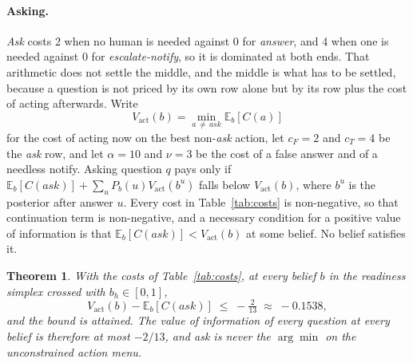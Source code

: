 \documentclass{article}
\newtheorem{theorem}{Theorem} %
\begin{document}
\paragraph{Asking.} \emph{Ask} costs 2 when no human is needed against 0 for
\emph{answer}, and 4 when one is needed against 0 for \emph{escalate-notify}, so
it is dominated at both ends. That arithmetic does not settle the middle, and the
middle is what has to be settled, because a question is not priced by its own row
alone but by its row plus the cost of acting afterwards. Write
\begin{equation}
V_{\mathrm{act}}(b) = \min_{a \,\neq\, \textit{ask}} \mathbb{E}_b[C(a)]
\end{equation}
for the cost of acting now on the best non-\emph{ask} action, let $c_F = 2$ and
$c_T = 4$ be the \emph{ask} row, and let $\alpha = 10$ and $\nu = 3$ be the cost
of a false answer and of a needless notify. Asking question $q$ pays only if
$\mathbb{E}_b[C(\textit{ask})] + \sum_u P_b(u) V_{\mathrm{act}}(b^u)$ falls below
$V_{\mathrm{act}}(b)$, where $b^u$ is the posterior after answer $u$. Every cost
in Table~\ref{tab:costs} is non-negative, so that continuation term is
non-negative, and a necessary condition for a positive value of information is
that $\mathbb{E}_b[C(\textit{ask})] < V_{\mathrm{act}}(b)$ at some belief. No
belief satisfies it.

\begin{theorem}
\label{thm:ceiling}
With the costs of Table~\ref{tab:costs}, at every belief $b$ in the readiness
simplex crossed with $b_h \in [0, 1]$,
\begin{equation*}
V_{\mathrm{act}}(b) - \mathbb{E}_b[C(\textit{ask})]
  \;\le\; -\tfrac{2}{13} \;\approx\; -0.1538 ,
\end{equation*}
and the bound is attained. The value of information of every question at every
belief is therefore at most $-2/13$, and \emph{ask} is never the $\arg\min$ on
the unconstrained action menu.
\end{theorem}
\end{document}
